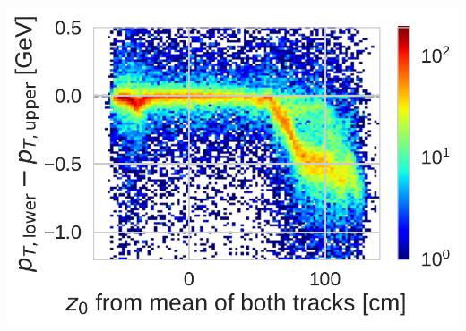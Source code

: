 \documentclass[18pt]{beamer}
\begin{document}
\begin{frame}
\begin{columns}
\begin{column}{0.45\textwidth}
      \includegraphics[width=1.\textwidth]{figures/efficiency_study/pt_distance_by_z0_gcr_august2017_data.pdf}
    \end{column}    
  \end{columns}
\end{frame}
\end{document}
